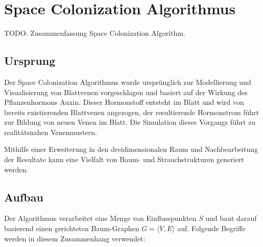 \chapter{Space Colonization Algorithmus}

TODO: Zusammenfassung Space Colonization Algorithm.

\section{Ursprung}
Der Space Colonization Algorithmus wurde ursprünglich zur Modellierung und Visualisierung von Blattvenen vorgeschlagen und basiert auf der Wirkung des Pflanzenhormons Auxin. Dieser Hormonstoff entsteht im Blatt und wird von bereits existierenden Blattvenen angezogen, der resultierende Hormonstrom führt zur Bildung von neuen Venen im Blatt. Die Simulation dieses Vorgangs führt zu realitätsnahen Venenmustern. \cite[Abschn. 2.5]{LeafVenation:05}

Mithilfe einer Erweiterung in den dreidimensionalen Raum und Nachbearbeitung der Resultate kann eine Vielfalt von Baum- und Strauchstrukturen generiert werden. \cite[Abschn. 1]{SpaceColonizationAlgorithm:07}

\section{Aufbau}

Der Algorithmus verarbeitet eine Menge von Einflusspunkten $S$ und baut darauf basierend einen gerichteten Baum-Graphen $G = \langle V,E\rangle$ auf. Folgende Begriffe werden in diesem Zusammenhang verwendet: 

